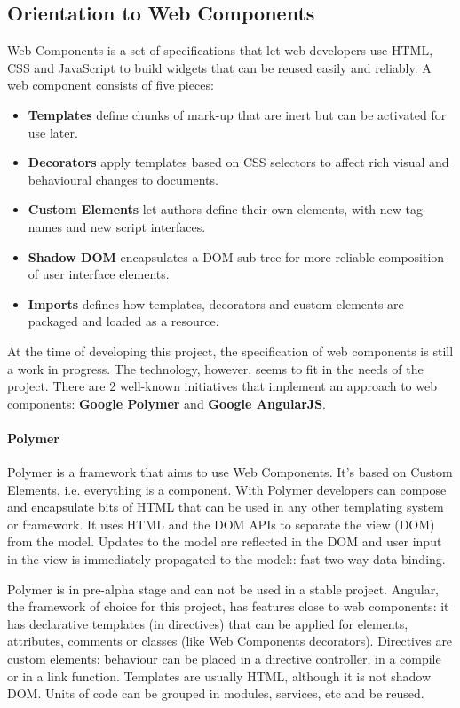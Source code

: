\subsection{Orientation to Web Components}
Web Components is a set of specifications that let web developers use \ac{HTML}, \ac{CSS} and JavaScript to build widgets that can be reused easily and reliably.
A web component consists of five pieces\cite{W3CComponents:2013}:
\begin{itemize}
    \item \textbf{Templates} define chunks of mark-up that are inert but can be activated for use later.
    \item \textbf{Decorators} apply templates based on CSS selectors to affect rich visual and behavioural changes to documents.
    \item \textbf{Custom Elements} let authors define their own elements, with new tag names and new script interfaces.
    \item \textbf{Shadow DOM}  encapsulates a DOM sub-tree for more reliable composition of user interface elements.
    \item \textbf{Imports} defines how templates, decorators and custom elements are packaged and loaded as a resource.
\end{itemize}

At the time of developing this project, the specification of web components is still a work in progress.
The technology, however, seems to fit in the needs of the project.
There are 2 well-known initiatives that implement an approach to web components: \textbf{Google Polymer} and \textbf{Google AngularJS}.

\paragraph{Polymer} Polymer is a framework that aims to use Web Components. 
It's based on Custom Elements, i.e. everything is a component.
With Polymer developers can compose and encapsulate bits of HTML that can be used in any other templating system or framework.
It uses \ac{HTML} and the \ac{DOM} \acp{API} to separate the view (\ac{DOM}) from the model. 
Updates to the model are reflected in the \ac{DOM} and user input in the view is immediately propagated to the model:: fast two-way data binding.

Polymer is in pre-alpha stage and can not be used in a stable project.
Angular, the framework of choice for this project, has features close to web components: it has declarative templates (in directives) that can be applied for elements, attributes, comments or classes (like Web Components decorators).
Directives are custom elements: behaviour can be placed in a directive controller, in a compile or in a link function.
Templates are usually \ac{HTML}, although it is not shadow \ac{DOM}.
Units of code can be grouped in modules, services, etc and be reused.

